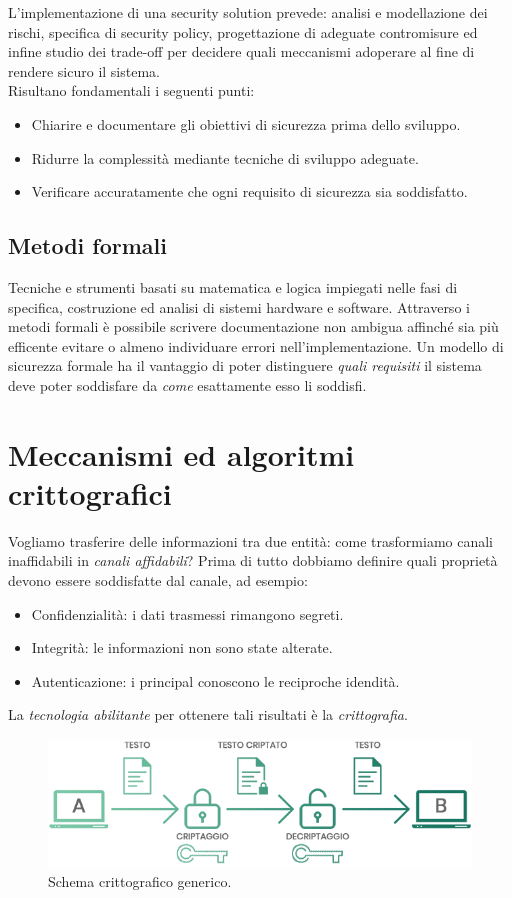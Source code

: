 \documentclass[a4paper, 11pt, twoside, openright, fleqn]{report}
\begin{document}
L'implementazione di una security solution prevede: analisi e modellazione dei rischi, specifica di security policy, progettazione di adeguate contromisure ed infine studio dei trade-off per decidere quali meccanismi adoperare al fine di rendere sicuro il sistema.\\
Risultano fondamentali i seguenti punti:
\begin{itemize}
	\item Chiarire e documentare gli obiettivi di sicurezza prima dello sviluppo.
	\item Ridurre la complessità mediante tecniche di sviluppo adeguate.
	\item Verificare accuratamente che ogni requisito di sicurezza sia soddisfatto.
\end{itemize}

\section{Metodi formali}
Tecniche e strumenti basati su matematica e logica impiegati nelle fasi di specifica, costruzione ed analisi di sistemi hardware e software. Attraverso i metodi formali è possibile scrivere documentazione non ambigua affinché sia più efficente evitare o almeno individuare errori nell'implementazione. Un modello di sicurezza formale ha il vantaggio di poter distinguere \emph{quali requisiti} il sistema deve poter soddisfare da \emph{come} esattamente esso li soddisfi.


\chapter{Meccanismi ed algoritmi crittografici}
Vogliamo trasferire delle informazioni tra due entità: come trasformiamo canali inaffidabili in \emph{canali affidabili}? Prima di tutto dobbiamo definire quali proprietà devono essere soddisfatte dal canale, ad esempio:
\begin{itemize}
	\item Confidenzialità: i dati trasmessi rimangono segreti.
	\item Integrità: le informazioni non sono state alterate.
	\item Autenticazione: i principal conoscono le reciproche idendità.
\end{itemize}
La \emph{tecnologia abilitante} per ottenere tali risultati è la \emph{crittografia}.
\begin{figure}[htp]
	\centering
	\includegraphics[width=.7\textwidth]{images/Crittografia.png}
	\caption{Schema crittografico generico.}\label{fig:schema-critto}
\end{figure}
\end{document}
